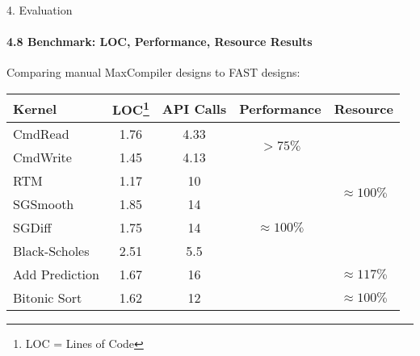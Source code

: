 \begin{frame}{4. Evaluation}
  \framesubtitle{4.8 Benchmark: LOC, Performance, Resource Results}
  Comparing manual MaxCompiler designs to FAST designs:
  {\footnotesize
    \begin{table}
      \renewcommand{\arraystretch}{1.5}
      \begin{tabular}{l|c|c|c|c}
        \textbf{Kernel} & \textbf{LOC\footnote{LOC = Lines of Code}} & \textbf{API Calls} & \textbf{Performance}              & \textbf{Resource}
        \\
        \hline\hline
        CmdRead         & 1.76               & 4.33                     & \multirow{2}{1.5cm}{$ > 75\%$}        & \multirow{6}{1.5cm}{$\approx 100\%$} \\
        CmdWrite        & 1.45               & 4.13                     &                                   &                              \\
        \cline{1-4}
        RTM             & 1.17               & 10                       & \multirow{5}{1.5cm}{$ \approx 100\%$} &                              \\
        SGSmooth        & 1.85               & 14                       &                                   &                              \\
        SGDiff         & 1.75               & 14                       &                                   &                              \\
        Black-Scholes   & 2.51               & 5.5                      &                                   &                              \\
        \cline{5-5}
        Add Prediction  & 1.67               & 16                       &                                   &    $ \approx 117 \% $                          \\
        Bitonic Sort & 1.62             & 12                    &                                   &    $ \approx 100 \% $                          \\
      \end{tabular}
    \end{table}}

\end{frame}